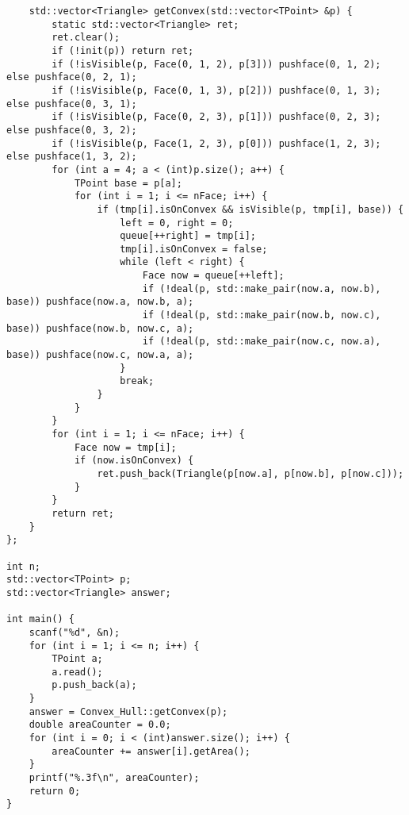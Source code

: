 \begin{lstlisting}
	std::vector<Triangle> getConvex(std::vector<TPoint> &p) {
		static std::vector<Triangle> ret;
		ret.clear();
		if (!init(p)) return ret;
		if (!isVisible(p, Face(0, 1, 2), p[3])) pushface(0, 1, 2); else pushface(0, 2, 1);
		if (!isVisible(p, Face(0, 1, 3), p[2])) pushface(0, 1, 3); else pushface(0, 3, 1);
		if (!isVisible(p, Face(0, 2, 3), p[1])) pushface(0, 2, 3); else pushface(0, 3, 2);
		if (!isVisible(p, Face(1, 2, 3), p[0])) pushface(1, 2, 3); else pushface(1, 3, 2);
		for (int a = 4; a < (int)p.size(); a++) {
			TPoint base = p[a];
			for (int i = 1; i <= nFace; i++) {
				if (tmp[i].isOnConvex && isVisible(p, tmp[i], base)) {
					left = 0, right = 0;
					queue[++right] = tmp[i];
					tmp[i].isOnConvex = false;
					while (left < right) {
						Face now = queue[++left];
						if (!deal(p, std::make_pair(now.a, now.b), base)) pushface(now.a, now.b, a);
						if (!deal(p, std::make_pair(now.b, now.c), base)) pushface(now.b, now.c, a);
						if (!deal(p, std::make_pair(now.c, now.a), base)) pushface(now.c, now.a, a);
					}
					break;
				}
			}
		}
		for (int i = 1; i <= nFace; i++) {
			Face now = tmp[i];
			if (now.isOnConvex) {
				ret.push_back(Triangle(p[now.a], p[now.b], p[now.c]));
			}
		}
		return ret;
	}
};

int n;
std::vector<TPoint> p;
std::vector<Triangle> answer;

int main() {
	scanf("%d", &n);
	for (int i = 1; i <= n; i++) {
		TPoint a;
		a.read();
		p.push_back(a);
	}
	answer = Convex_Hull::getConvex(p);
	double areaCounter = 0.0;
	for (int i = 0; i < (int)answer.size(); i++) {
		areaCounter += answer[i].getArea();
	}
	printf("%.3f\n", areaCounter);
	return 0;
}
\end{lstlisting}
